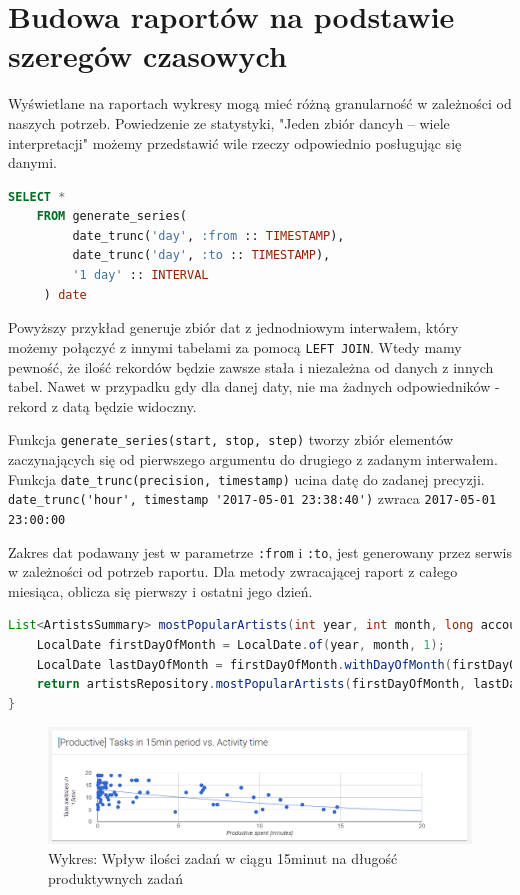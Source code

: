 \documentclass[brudnopis]{xmgr}
\begin{document}
    \section{Budowa raportów na podstawie szeregów czasowych}

    Wyświetlane na raportach wykresy mogą mieć różną granularność w zależności od naszych potrzeb.
    Powiedzenie ze statystyki, "Jeden zbiór dancyh -- wiele interpretacji" możemy przedstawić wile rzeczy odpowiednio posługując się danymi.

    \begin{lstlisting}[language=sql]
    SELECT *
    FROM generate_series(
         date_trunc('day', :from :: TIMESTAMP),
         date_trunc('day', :to :: TIMESTAMP),
         '1 day' :: INTERVAL
     ) date
    \end{lstlisting}

    Powyższy przykład generuje zbiór dat z jednodniowym interwałem,
    który możemy połączyć z innymi tabelami za pomocą \verb|LEFT JOIN|.
    Wtedy mamy pewność, że ilość rekordów będzie zawsze stała i niezależna od danych z innych tabel.
    Nawet w przypadku gdy dla danej daty, nie ma żadnych odpowiedników - rekord z datą będzie widoczny.

    Funkcja \verb|generate_series(start, stop, step)| tworzy zbiór elementów
    zaczynających się od pierwszego argumentu do drugiego z zadanym interwałem.
    Funkcja \verb|date_trunc(precision, timestamp)| ucina datę do zadanej precyzji.
    \verb|date_trunc('hour', timestamp '2017-05-01 23:38:40')| zwraca \verb|2017-05-01 23:00:00|

    Zakres dat podawany jest w parametrze \verb|:from| i \verb|:to|, jest generowany przez serwis w zależności od potrzeb raportu.
    Dla metody zwracającej raport z całego miesiąca, oblicza się pierwszy i ostatni jego dzień.

    \begin{lstlisting}[language=java]
List<ArtistsSummary> mostPopularArtists(int year, int month, long accountId) {
    LocalDate firstDayOfMonth = LocalDate.of(year, month, 1);
    LocalDate lastDayOfMonth = firstDayOfMonth.withDayOfMonth(firstDayOfMonth.lengthOfMonth());
    return artistsRepository.mostPopularArtists(firstDayOfMonth, lastDayOfMonth, accountId);
}
    \end{lstlisting}

    \begin{figure}
        \includegraphics[width=\linewidth]{fig/ui/chart-tasks-productive.png}
        \caption{Wykres: Wpływ ilości zadań w ciągu 15minut na długość produktywnych zadań}
        \label{fig:ui:chart-tasks-productive}
    \end{figure}
\end{document}

